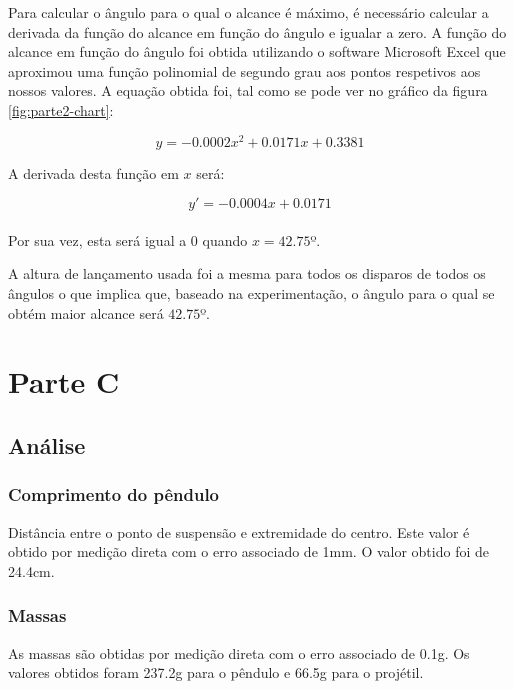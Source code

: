 {Para calcular o ângulo para o qual o alcance é máximo, é necessário calcular a derivada da função do alcance em função do ângulo e igualar a zero. A função do alcance em função do ângulo foi obtida utilizando o software Microsoft Excel que aproximou uma função polinomial de segundo grau aos pontos respetivos aos nossos valores. A equação obtida foi, tal como se pode ver no gráfico da figura \ref{fig:parte2-chart}:

\begin{equation}
    y = -0.0002x^2 + 0.0171x + 0.3381
\end{equation}

A derivada desta função em $x$ será:

\begin{equation}
    y' = -0.0004x + 0.0171
\end{equation}\\
Por sua vez, esta será igual a 0 quando $x = 42.75$º.\bigskip

A altura de lançamento usada foi a mesma para todos os disparos de todos os ângulos o que implica que, baseado na experimentação, o ângulo para o qual se obtém maior alcance será $42.75$º.

\pagebreak

\section{Parte C}
\label{sec:analise-discussao-parte3}

\subsection{Análise}
\label{subsec:analise-discussao-parte3-analise}

\subsubsection{Comprimento do pêndulo}
\label{subsec:analise-discussao-parte3-comprimento}

Distância entre o ponto de suspensão e extremidade do centro. Este valor é obtido por medição direta com o erro associado de 1mm. O valor obtido foi de 24.4cm.

\subsubsection{Massas}
\label{subsec:analise-discussao-parte3-massas}

As massas são obtidas por medição direta com o erro associado de 0.1g. Os valores obtidos foram 237.2g para o pêndulo e 66.5g para o projétil.

}
